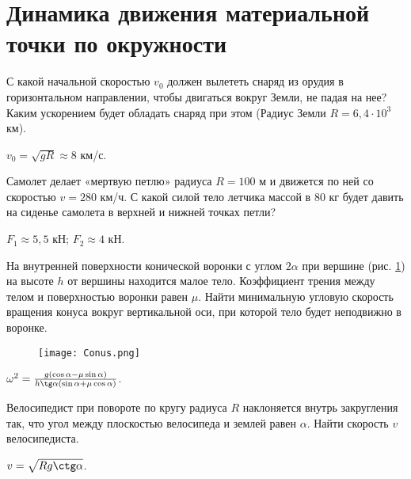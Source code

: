 \section{Динамика движения материальной точки по окружности}

\begin{ex} %
С какой начальной скоростью $v_0$ должен вылететь снаряд из орудия в горизонтальном направлении, чтобы двигаться вокруг Земли, не падая на нее? Каким ускорением будет обладать снаряд при этом (Радиус Земли $R = 6,4 \cdot 10^3$ км).
\begin{ans}
$v_0 = \sqrt{gR} \approx 8$ км/с.
\end{ans}
\end{ex}	

\begin{ex} %
Самолет делает «мертвую петлю» радиуса $R = 100$ м и движется по ней со скоростью $v = 280$ км/ч. С какой силой тело летчика массой в 80 кг будет давить на сиденье самолета в верхней и нижней точках петли?
\begin{ans}
$F_1 \approx 5,5$ кН; $F_2 \approx 4$ кН.
\end{ans}
\end{ex}	

\begin{ex}  %
На внутренней поверхности конической воронки с углом $2\alpha$ при вершине (рис. \ref{Conus}) на высоте $h$ от вершины находится малое тело. Коэффициент трения между телом и поверхностью воронки равен $\mu$. Найти минимальную угловую скорость вращения конуса вокруг вертикальной оси, при которой тело будет неподвижно в воронке.

\begin{figure}[h]
\centering
\texttt{[image: Conus.png]}
\caption{}
\label{Conus}
\end{figure}

\begin{ans}
$\omega^2 = \frac{g(\cos \alpha - \mu \sin \alpha)}{h \tg \alpha (\sin \alpha + \mu \cos \alpha)}$.
\end{ans}
\end{ex}	

\begin{ex} %
Велосипедист при повороте по кругу радиуса $R$ наклоняется внутрь закругления так, что угол между плоскостью велосипеда и землей равен $\alpha$. Найти скорость $v$ велосипедиста.
\begin{ans}
$v = \sqrt{Rg \ctg \alpha}$.
\end{ans}
\end{ex}	

